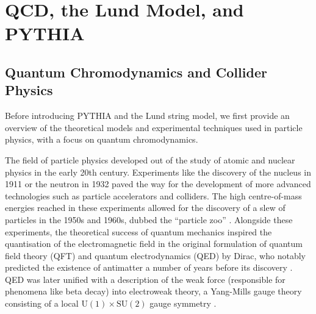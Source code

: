 \documentclass[12pt,a4paper]{report}
\begin{document}
\chapter{QCD, the Lund Model, and PYTHIA}
\label{chap:background}
\section{Quantum Chromodynamics and Collider Physics}
Before introducing PYTHIA and the Lund string model, we first provide an overview of the theoretical models and experimental techniques used in particle physics, with a focus on quantum chromodynamics.

The field of particle physics developed out of the study of atomic and nuclear physics in the early 20th century. Experiments like the discovery of the nucleus in 1911 \cite{Rutherford:1911zz} or the neutron in 1932 \cite{Chadwick:1932wcf} paved the way for the development of more advanced technologies such as particle accelerators and colliders. The high centre-of-mass energies reached in these experiments allowed for the discovery of a slew of particles in the 1950s and 1960s, dubbed the ``particle zoo'' \cite{Gross:2022hyw}. Alongside these experiments, the theoretical success of quantum mechanics inspired the quantisation of the electromagnetic field in the original formulation of quantum field theory (QFT) and quantum electrodynamics (QED) by Dirac, who notably predicted the existence of antimatter a number of years before its discovery \cite{Dirac:1928hu,Anderson:1932zz}. QED was later unified with a description of the weak force (responsible for phenomena like beta decay) into electroweak theory, a Yang-Mills gauge theory consisting of a local $\text{U}(1) \times \text{SU}(2)$ gauge symmetry \cite{ParticleDataGroup:2024cfk,Thomson:2013zua}.
\end{document}

